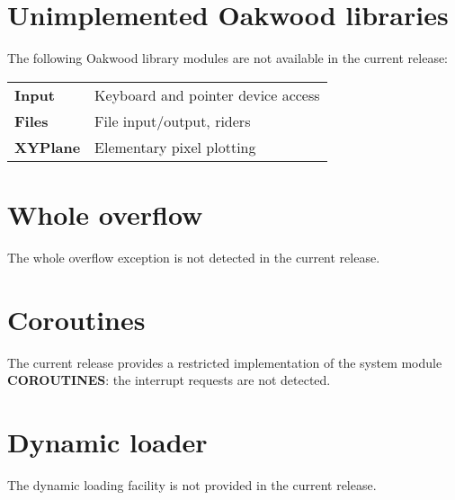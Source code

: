 \section*{Unimplemented Oakwood libraries}

The following \ot{} Oakwood library modules are not
available in the current release:
\begin{flushleft}
\begin{tabular}{lp{7cm}}
\bf Input   & Keyboard and pointer device access \\
\bf Files   & File input/output, riders          \\
\bf XYPlane & Elementary pixel plotting          \\
\end{tabular}
\end{flushleft}

\ifgenc
\section*{Whole overflow}

The whole overflow exception is not detected in the current release.
\fi %

\section*{Coroutines}

The current release provides a restricted implementation of the
system module {\bf COROUTINES}: the interrupt requests are not
detected.

\section*{Dynamic loader}

The \ot{} dynamic loading facility is not provided in the current release.
